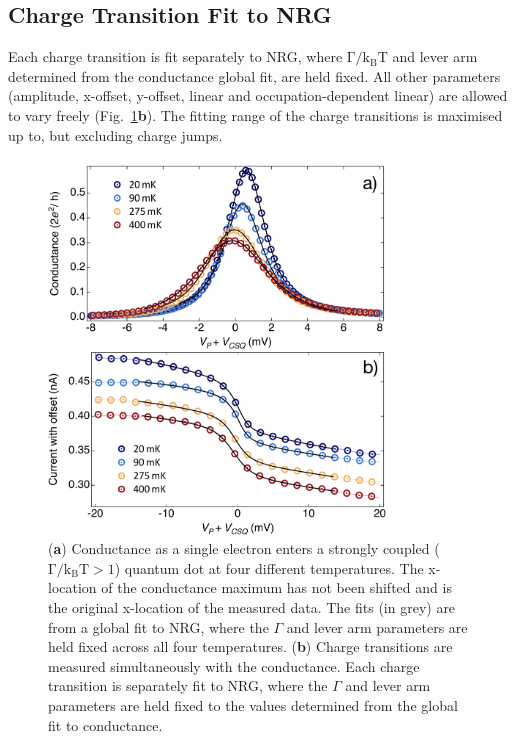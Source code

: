 \subsection{Charge Transition Fit to NRG}
Each charge transition is fit separately to NRG, where $\mathrm{\Gamma/k_BT}$ and lever arm determined from the conductance global fit, are held fixed. All other parameters (amplitude, x-offset, y-offset, linear and occupation-dependent linear) are allowed to vary freely (Fig.~\ref{fig:ch3/cond_ct_gf}\textbf{b}). The fitting range of the charge transitions is maximised up to, but excluding charge jumps.


\begin{figure}[H]
 \begin{center}
 \includegraphics[width=0.85\textwidth]{figures/ch3/figure13.pdf}
 \caption[Fittin Conductance and Charge Transition to NRG]{\label{fig:ch3/cond_ct_gf} 
 (\textbf{a}) Conductance as a single electron enters a strongly coupled ($\mathrm{\Gamma/k_BT > 1}$) quantum dot at four different temperatures. The x-location of the conductance maximum has not been shifted and is the original x-location of the measured data. The fits (in grey) are from a global fit to NRG, where the $\Gamma$ and lever arm parameters are held fixed across all four temperatures. (\textbf{b}) Charge transitions are measured simultaneously with the conductance. Each charge transition is separately fit to NRG, where the $\Gamma$ and lever arm parameters are held fixed to the values determined from the global fit to conductance.}
 \end{center}
\end{figure}



